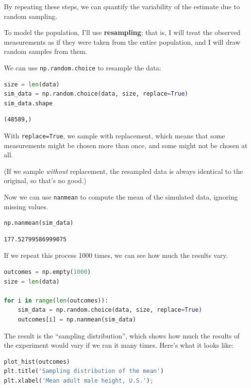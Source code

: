 By repeating these steps, we can quantify the variability of the
estimate due to random sampling.

To model the population, I'll use \textbf{resampling}; that is, I will
treat the observed measurements as if they were taken from the entire
population, and I will draw random samples from them.

We can use \passthrough{\lstinline!np.random.choice!} to resample the
data:

\begin{lstlisting}[language=Python,style=source]
size = len(data)
sim_data = np.random.choice(data, size, replace=True)
sim_data.shape
\end{lstlisting}

\begin{lstlisting}[style=output]
(48589,)
\end{lstlisting}

With \passthrough{\lstinline!replace=True!}, we sample with replacement,
which means that some measurements might be chosen more than once, and
some might not be chosen at all.

(If we sample \emph{without} replacement, the resampled data is always
identical to the original, so that's no good.)

Now we can use \passthrough{\lstinline!nanmean!} to compute the mean of
the simulated data, ignoring missing values.

\begin{lstlisting}[language=Python,style=source]
np.nanmean(sim_data)
\end{lstlisting}

\begin{lstlisting}[style=output]
177.52799586999075
\end{lstlisting}

If we repeat this process 1000 times, we can see how much the results
vary.

\begin{lstlisting}[language=Python,style=source]
outcomes = np.empty(1000)
size = len(data)

for i in range(len(outcomes)):
    sim_data = np.random.choice(data, size, replace=True)
    outcomes[i] = np.nanmean(sim_data)
\end{lstlisting}

The result is the ``sampling distribution'', which shows how much the
results of the experiment would vary if we ran it many times. Here's
what it looks like:

\begin{lstlisting}[language=Python,style=source]
plot_hist(outcomes)
plt.title('Sampling distribution of the mean')
plt.xlabel('Mean adult male height, U.S.');
\end{lstlisting}

